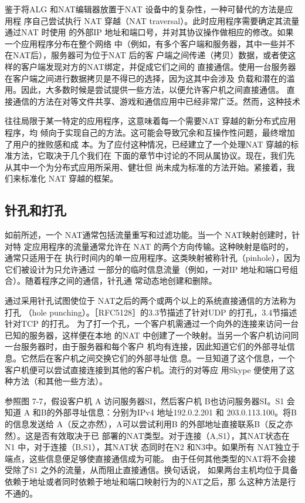 鉴于将ALG 和NAT编辑器放置于NAT 设备中的复杂性，一种可替代的方法是应用程
序自己尝试执行 NAT 穿越（NAT traversal）。此时应用程序需要确定其流量通过NAT 时使用
的外部IP 地址和端口号，并对其协议操作做相应的修改。如果一个应用程序分布在整个网络
中（例如，有多个客户端和服务器，其中一些并不在NAT后），服务器可为位于NAT 后的客
户端之间传递（拷贝）数据，或者使这样的客户端发现对方的NAT绑定，并促成它们之间的
直接通信。使用一台服务器在客户端之间进行数据拷贝是不得已的选择，因为这其中会涉及
负载和潜在的滥用。因此，大多数时候是尝试提供一些方法，以便允许客户机之间直接通信。
直接通信的方法在对等文件共享、游戏和通信应用中已经非常广泛。然而，这种技术

往往局限于某一特定的应用程序，这意味着每一个需要NAT 穿越的新分布式应用程序，均
倾向于实现自己的方法。这可能会导致冗余和互操作性问题，最终增加了用户的挫败感和成
本。为了应付这种情况，已经建立了一个处理NAT 穿越的标准方法，它取决于几个我们在
下面的章节中讨论的不同从属协议。现在，我们先从其中一个为分布式应用所采用、健壮但
尚未成为标准的方法开始。紧接着，我们来标准化 NAT 穿越的框架。

\subsection{针孔和打孔}

如前所述，一个 NAT通常包括流量重写和过滤功能。当一个 NAT映射创建时，针对特
定应用程序的流量通常允许在 NAT 的两个方向传输。这种映射是临时的，通常只适用于在
执行时间内的单一应用程序。这类映射被称针孔（pinhole），因为它们被设计为只允许通过
一部分的临时信息流量（例如，一对IP 地址和端口号组合）。随着程序之间的通信，针孔通
常动态地创建和删除。

通过采用针孔试图使位于 NAT之后的两个或两个以上的系统直接通信的方法称为打孔
（hole punching）。［RFC5128］的3.3节描述了针对UDP 的打孔，3.4节描述针对TCP 的打孔。
为了打一个孔，一个客户机需通过一个向外的连接来访问一台已知的服务器，这样便在本地
的NAT 中创建了一个映射。当另一个客户机访问同一台服务器时，由于服务器和每个客户
机均有连接，因此知道它们的外部寻址信息。它然后在客户机之间交换它们的外部寻址信
息。一旦知道了这个信息，一个客户机便可以尝试直接连接到其他的客户机。流行的对等应
用Skype 便使用了这种方法（和其他一些方法）。

参照图 7-7，假设客户机 A 访问服务器SI，然后客户机 B也访问服务器SI。S1 会知道
A 和B的外部寻址信息：分别为IPv4 地址192.0.2.201 和 203.0.113.100。将B 的信息发送给
A（反之亦然），A可以尝试利用B 的外部地址直接联系B（反之亦然）。这是否有效取决于已
部署的NAT类型。对于连接（A,S1），其NAT状态在 N1 中，对于连接（B,S1），其NAT状
态同时在N2 和N3中。如果所有 NAT独立于端点，这些信息便足够使直接通信成为可能。
由于任何其他类型的NAT将不会接受除了S1 之外的流量，从而阻止直接通信。换句话说，
如果两台主机均位于具备依赖于地址或者同时依赖于地址和端口映射行为的NAT之后，那
么这种方法是行不通的。

